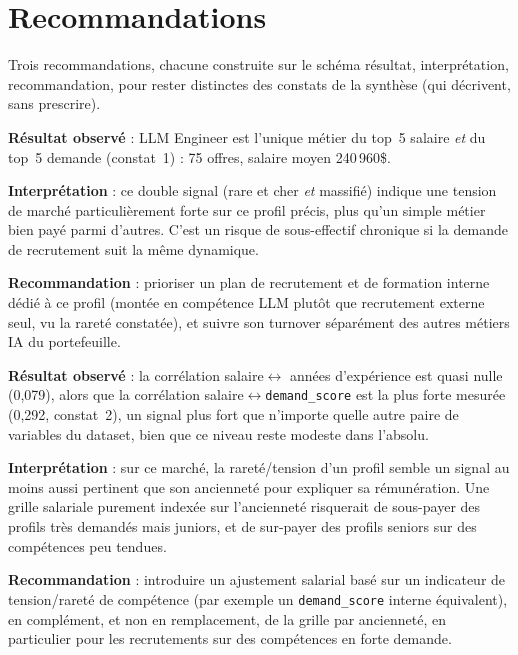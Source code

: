 \chapter{Recommandations}

Trois recommandations, chacune construite sur le schéma
résultat, interprétation, recommandation, pour rester distinctes des
constats de la synthèse (qui décrivent, sans prescrire).

\begin{recommandation}
\textbf{Résultat observé} : LLM Engineer est l'unique métier du top~5
salaire \emph{et} du top~5 demande (constat~1) : 75
offres, salaire moyen 240\,960\$.

\textbf{Interprétation} : ce double signal (rare et cher \emph{et}
massifié) indique une tension de marché particulièrement forte sur ce
profil précis, plus qu'un simple métier bien payé parmi d'autres. C'est
un risque de sous-effectif chronique si la demande de recrutement suit
la même dynamique.

\textbf{Recommandation} : prioriser un plan de recrutement et de
formation interne dédié à ce profil (montée en compétence LLM plutôt
que recrutement externe seul, vu la rareté constatée), et suivre son
turnover séparément des autres métiers IA du portefeuille.
\end{recommandation}

\begin{recommandation}
\textbf{Résultat observé} : la corrélation salaire$\leftrightarrow$
années d'expérience est quasi nulle (0,079), alors que la corrélation
salaire$\leftrightarrow$\texttt{demand\_score} est la plus forte
mesurée (0,292, constat~2), un signal plus fort que
n'importe quelle autre paire de variables du dataset, bien que ce
niveau reste modeste dans l'absolu.

\textbf{Interprétation} : sur ce marché, la rareté/tension d'un profil
semble un signal au moins aussi pertinent que son ancienneté pour
expliquer sa rémunération. Une grille salariale purement indexée sur
l'ancienneté risquerait de sous-payer des profils très demandés mais
juniors, et de sur-payer des profils seniors sur des compétences peu
tendues.

\textbf{Recommandation} : introduire un ajustement salarial basé sur un
indicateur de tension/rareté de compétence (par exemple un
\texttt{demand\_score} interne équivalent), en complément, et non en
remplacement, de la grille par ancienneté, en particulier pour les
recrutements sur des compétences en forte demande.
\end{recommandation}

